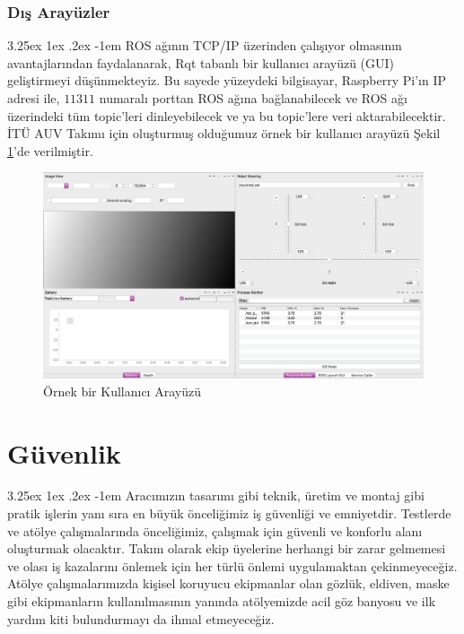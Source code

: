 \documentclass[12pt]{article}
\makeatletter
\renewcommand\paragraph{\@startsection{paragraph}{5}{\z@}%
  {3.25ex \@plus1ex \@minus.2ex}%
  {-1em}%
  {\normalfont\normalsize\bfseries}}
\makeatother
\begin{document}
\subsubsection{Dış Arayüzler}
\paragraph{} ROS ağının TCP/IP üzerinden çalışıyor olmasının avantajlarından faydalanarak, Rqt tabanlı bir kullanıcı arayüzü (GUI) geliştirmeyi düşünmekteyiz. Bu sayede yüzeydeki bilgisayar, Raspberry Pi'ın IP adresi ile, $11311$ numaralı porttan ROS ağına bağlanabilecek ve ROS ağı üzerindeki tüm topic'leri dinleyebilecek ve ya bu topic'lere veri aktarabilecektir. İTÜ AUV Takımı için oluşturmuş olduğumuz örnek bir kullanıcı arayüzü Şekil \ref{fig:gui}'de verilmiştir.

\begin{figure}
\centering
\includegraphics[width=1\textwidth]{images/gui.png}
\caption{Örnek bir Kullanıcı Arayüzü}
\label{fig:gui}
\end{figure}


\section{Güvenlik}

\paragraph{} Aracımızın tasarımı gibi teknik, üretim ve montaj gibi pratik işlerin yanı sıra en büyük önceliğimiz iş güvenliği ve emniyetdir. Testlerde ve atölye çalışmalarında önceliğimiz, çalışmak için güvenli ve konforlu alanı oluşturmak olacaktır. Takım olarak ekip üyelerine herhangi bir zarar gelmemesi ve olası iş kazalarını önlemek için her türlü önlemi uygulamaktan çekinmeyeceğiz.
Atölye çalışmalarımızda kişisel koruyucu ekipmanlar olan gözlük, eldiven, maske gibi ekipmanların kullanılmasının yanında atölyemizde acil göz banyosu ve ilk yardım kiti bulundurmayı da ihmal etmeyeceğiz.
\end{document}
